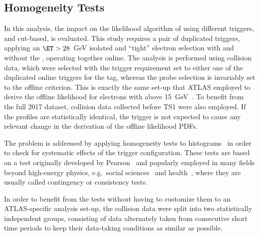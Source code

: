 \FloatBarrier
\subsection[Homogeneity Tests]{Homogeneity Tests}\label{ssec:agreement}

In this analysis, the impact on the likelihood algorithm of using different triggers, \rnn{} and cut-based, is evaluated. 
This study requires a pair of duplicated triggers, applying an $\ET > 28$~GeV isolated and \enquote{tight} electron selection with and without the \rnn{}, operating together online.  
The analysis is performed using \Zee{} \tnp{} collision data, which were selected with the trigger requirement set to either one of the duplicated online triggers for the tag, whereas the probe selection is invariably set to the offline \vloose{} criterion. This is exactly the same set-up that ATLAS employed to derive the offline likelihood for electrons with \ET above \SI{15}{\GeV}~\cite{PERF-2017-01}. 
To benefit from the full 2017 dataset, collision data collected before TS1 were also employed. If the profiles are statistically identical, the \rnn{} trigger is not expected to cause any relevant change in the derivation of the offline likelihood PDFs.  







The problem is addressed by applying homogeneity tests to histograms~\cite{homogeneity_test} in order to check for systematic effects of the trigger configuration. These tests are based on a test originally developed by Pearson~\cite{pearson1911probability} and popularly employed in many fields beyond high-energy physics, e.g.\ social sciences~\cite{wickens2014multiway} and health~\cite{ma2015homogeneity}, where they are usually called contingency or consistency tests.

In order to benefit from the tests without having to customize them to an ATLAS-specific analysis set-up, the collision data were split into two
statistically independent groups, consisting of data alternately taken from consecutive short time periods to keep their data-taking conditions as
similar as possible. 

